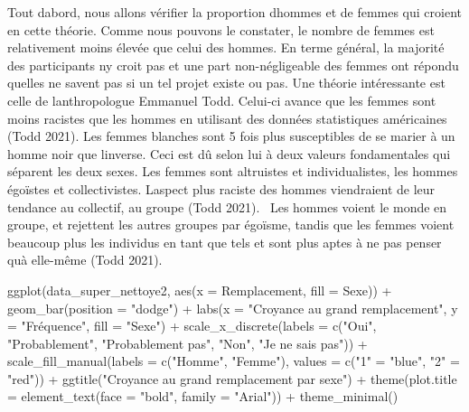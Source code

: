 \documentclass[
  letterpaper,
  DIV=11,
  numbers=noendperiod]{scrartcl}
\newenvironment{Shaded}{\begin{snugshade}}{\end{snugshade}}
\newcommand{\AttributeTok}[1]{\textcolor[rgb]{0.40,0.45,0.13}{#1}}
\newcommand{\FunctionTok}[1]{\textcolor[rgb]{0.28,0.35,0.67}{#1}}
\newcommand{\NormalTok}[1]{\textcolor[rgb]{0.00,0.23,0.31}{#1}}
\newcommand{\OtherTok}[1]{\textcolor[rgb]{0.00,0.23,0.31}{#1}}
\newcommand{\SpecialCharTok}[1]{\textcolor[rgb]{0.37,0.37,0.37}{#1}}
\newcommand{\StringTok}[1]{\textcolor[rgb]{0.13,0.47,0.30}{#1}}
\begin{document}
Tout d\textquotesingle abord, nous allons vérifier la proportion
d\textquotesingle hommes et de femmes qui croient en cette théorie.
Comme nous pouvons le constater, le nombre de femmes est relativement
moins élevée que celui des hommes. En terme général, la majorité des
participants n\textquotesingle y croit pas et une part non-négligeable
des femmes ont répondu qu\textquotesingle elles ne savent pas si un tel
projet existe ou pas. Une théorie intéressante est celle de
l\textquotesingle anthropologue Emmanuel Todd. Celui-ci avance que les
femmes sont moins racistes que les hommes en utilisant des données
statistiques américaines (Todd 2021). Les femmes blanches sont 5 fois
plus susceptibles de se marier à un homme noir que
l\textquotesingle inverse. Ceci est dû selon lui à deux valeurs
fondamentales qui séparent les deux sexes. Les femmes sont altruistes et
individualistes, les hommes égoïstes et collectivistes.
L\textquotesingle aspect plus raciste des hommes viendraient de leur
tendance au collectif, au groupe (Todd 2021). ~Les hommes voient le
monde en groupe, et rejettent les autres groupes par égoïsme, tandis que
les femmes voient beaucoup plus les individus en tant que tels et sont
plus aptes à ne pas penser qu\textquotesingle à elle-même (Todd 2021).

\begin{Shaded}
\begin{Highlighting}[]
\FunctionTok{ggplot}\NormalTok{(data\_super\_nettoye2, }\FunctionTok{aes}\NormalTok{(}\AttributeTok{x =}\NormalTok{ Remplacement, }\AttributeTok{fill =}\NormalTok{ Sexe)) }\SpecialCharTok{+}
  \FunctionTok{geom\_bar}\NormalTok{(}\AttributeTok{position =} \StringTok{"dodge"}\NormalTok{) }\SpecialCharTok{+}
    \FunctionTok{labs}\NormalTok{(}\AttributeTok{x =} \StringTok{"Croyance au grand remplacement"}\NormalTok{, }\AttributeTok{y =} \StringTok{"Fréquence"}\NormalTok{, }\AttributeTok{fill =} \StringTok{"Sexe"}\NormalTok{) }\SpecialCharTok{+}
   \FunctionTok{scale\_x\_discrete}\NormalTok{(}\AttributeTok{labels =} \FunctionTok{c}\NormalTok{(}\StringTok{"Oui"}\NormalTok{, }\StringTok{"Probablement"}\NormalTok{, }\StringTok{"Probablement pas"}\NormalTok{, }\StringTok{"Non"}\NormalTok{, }\StringTok{"Je ne sais pas"}\NormalTok{)) }\SpecialCharTok{+}
  \FunctionTok{scale\_fill\_manual}\NormalTok{(}\AttributeTok{labels =} \FunctionTok{c}\NormalTok{(}\StringTok{"Homme"}\NormalTok{, }\StringTok{"Femme"}\NormalTok{), }\AttributeTok{values =} \FunctionTok{c}\NormalTok{(}\StringTok{"1"} \OtherTok{=} \StringTok{"blue"}\NormalTok{, }\StringTok{"2"} \OtherTok{=} \StringTok{"red"}\NormalTok{)) }\SpecialCharTok{+}
  \FunctionTok{ggtitle}\NormalTok{(}\StringTok{"Croyance au grand remplacement par sexe"}\NormalTok{) }\SpecialCharTok{+}
   \FunctionTok{theme}\NormalTok{(}\AttributeTok{plot.title =} \FunctionTok{element\_text}\NormalTok{(}\AttributeTok{face =} \StringTok{"bold"}\NormalTok{, }\AttributeTok{family =} \StringTok{"Arial"}\NormalTok{)) }\SpecialCharTok{+}
  \FunctionTok{theme\_minimal}\NormalTok{()}
\end{Highlighting}
\end{Shaded}
\end{document}
